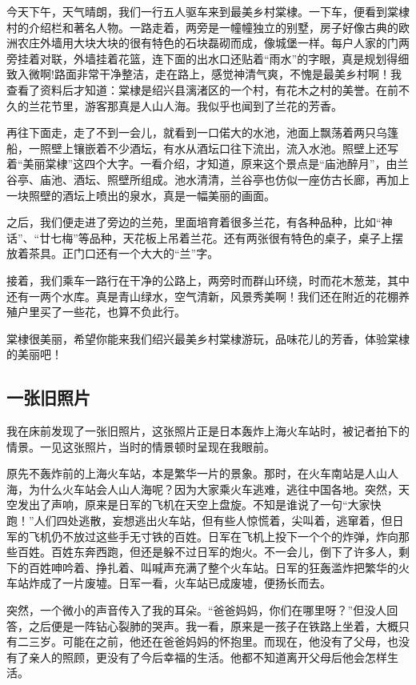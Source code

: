 \documentclass[UTF8,a4paper,titlepage,twoside,10.5pt]{article}
\begin{document}
今天下午，天气晴朗，我们一行五人驱车来到最美乡村棠棣。一下车，便看到棠棣村的介绍栏和著名人物。一路走着，两旁是一幢幢独立的别墅，房子好像古典的欧洲农庄外墙用大块大块的很有特色的石块磊砌而成，像城堡一样。每户人家的门两旁挂着对联，外墙挂着花篮，连下面的出水口还贴着“雨水”的字眼，真是规划得细致入微啊!路面非常干净整洁，走在路上，感觉神清气爽，不愧是最美乡村啊！我查看了资料后才知道：棠棣是绍兴县漓渚区的一个村，有花木之村的美誉。在前不久的兰花节里，游客那真是人山人海。我似乎也闻到了兰花的芳香。

再往下面走，走了不到一会儿，就看到一口偌大的水池，池面上飘荡着两只乌篷船，一照壁上镶嵌着不少酒坛，有水从酒坛口往下流出，流入水池。照壁上还写着“美丽棠棣”这四个大字。一看介绍，才知道，原来这个景点是“庙池醉月”，由兰谷亭、庙池、酒坛、照壁所组成。池水清清，兰谷亭也仿似一座仿古长廊，再加上一块照壁的酒坛上喷出的泉水，真是一幅美丽的画面。

之后，我们便走进了旁边的兰苑，里面培育着很多兰花，有各种品种，比如“神话”、“廿七梅”等品种，天花板上吊着兰花。还有两张很有特色的桌子，桌子上摆放着茶具。正门口还有一个大大的“兰”字。

接着，我们乘车一路行在干净的公路上，两旁时而群山环绕，时而花木葱茏，其中还有一两个水库。真是青山绿水，空气清新，风景秀美啊！我们还在附近的花棚养殖户里买了一些花，也算不负此行。

棠棣很美丽，希望你能来我们绍兴最美乡村棠棣游玩，品味花儿的芳香，体验棠棣的美丽吧！

\subsection{一张旧照片}
\label{sec:orga293d6b}

我在床前发现了一张旧照片，这张照片正是日本轰炸上海火车站时，被记者拍下的情景。一见这张照片，当时的情景顿时呈现在我眼前。

原先不轰炸前的上海火车站，本是繁华一片的景象。那时，在火车南站是人山人海，为什么火车站会人山人海呢？因为大家乘火车逃难，逃往中国各地。突然，天空发出了声响，原来是日军的飞机在天空上盘旋。不知是谁说了一句“大家快跑！”人们四处逃散，妄想逃出火车站，但有些人惊慌着，尖叫着，逃窜着，但日军的飞机仍不放过这些手无寸铁的百姓。日军在飞机上投下一个个的炸弹，炸向那些百姓。百姓东奔西跑，但还是躲不过日军的炮火。不一会儿，倒下了许多人，剩下的百姓呻吟着、挣扎着、叫喊声充满了整个火车站。日军的狂轰滥炸把繁华的火车站炸成了一片废墟。日军一看，火车站已成废墟，便扬长而去。

突然，一个微小的声音传入了我的耳朵。“爸爸妈妈，你们在哪里呀？”但没人回答，之后便是一阵钻心裂肺的哭声。我一看，原来是一孩子在铁路上坐着，大概只有二三岁。可能在之前，他还在爸爸妈妈的怀抱里。而现在，他没有了父母，也没有了亲人的照顾，更没有了今后幸福的生活。他都不知道离开父母后他会怎样生活。
\end{document}
